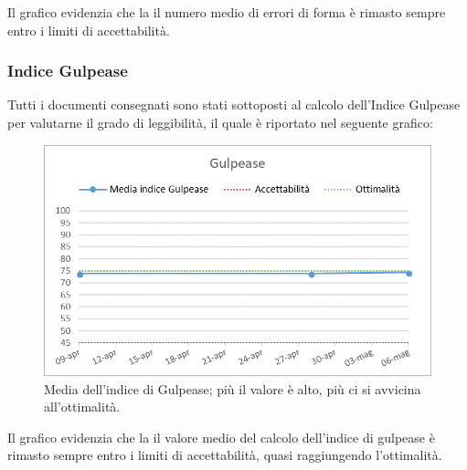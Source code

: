Il grafico evidenzia che la il numero medio di errori di forma è rimasto sempre entro i limiti di accettabilità.
\newpage

\subsubsection{Indice Gulpease}

Tutti i documenti consegnati sono stati sottoposti al calcolo dell'Indice Gulpease per valutarne il grado di leggibilità, il quale è riportato nel seguente grafico:

\begin{figure}[h!]
	\centering
	\includegraphics[scale=0.6]{img/Grafici/Gulpease.png}
	\caption{Media dell'indice di Gulpease; più il valore è alto, più ci si avvicina all'ottimalità.}
	\label{fig:Gulpease}
\end{figure}

Il grafico evidenzia che la il valore medio del calcolo dell'indice di gulpease è rimasto sempre entro i limiti di accettabilità, quasi raggiungendo l'ottimalità.

